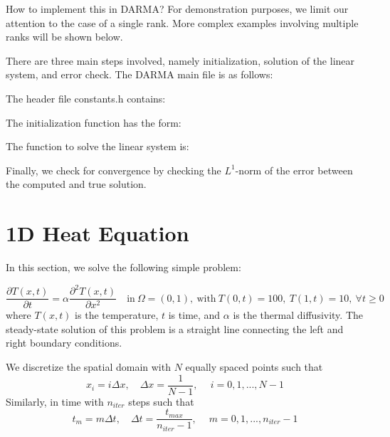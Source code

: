 How to implement this in DARMA? 
For demonstration purposes, we limit our attention to the case 
of a single rank. More complex examples involving multiple ranks will be shown below. 

There are three main steps involved, namely initialization, 
solution of the linear system, and error check. 
The DARMA main file is as follows:


The header file constants.h contains:


The initialization function has the form:


The function to solve the linear system is:


Finally, we check for convergence by checking the $L^1$-norm of the 
error between the computed and true solution.






\section{1D Heat Equation}

In this section, we solve the following simple problem:

\begin{equation} 
	\frac{\partial T(x,t)}{\partial t} = 
  \alpha \frac{\partial^2 T(x,t)}{\partial x^2} \quad 
  \text{in} \ \Omega=(0,1), \ \text{with} 
  \ T(0,t)=100, \ T(1,t)=10, \ \forall t \geq 0
\end{equation} 
where $T(x,t)$ is the temperature, $t$ is time, and $\alpha$ is the 
thermal diffusivity. The steady-state solution of this problem is 
a straight line connecting the left and right boundary conditions. 

We discretize the spatial domain with $N$ equally spaced points such that 
\begin{equation}
x_i = i \Delta x, \quad \Delta x=\frac{1}{N-1}, \quad \ i=0,1,...,N-1
\end{equation}
Similarly, in time with $n_{iter}$ steps such that 
\begin{equation}
t_m = m \Delta t, \quad \Delta t=\frac{t_{max}}{n_{iter}-1}, \quad \ m=0,1,...,n_{iter}-1
\end{equation}


